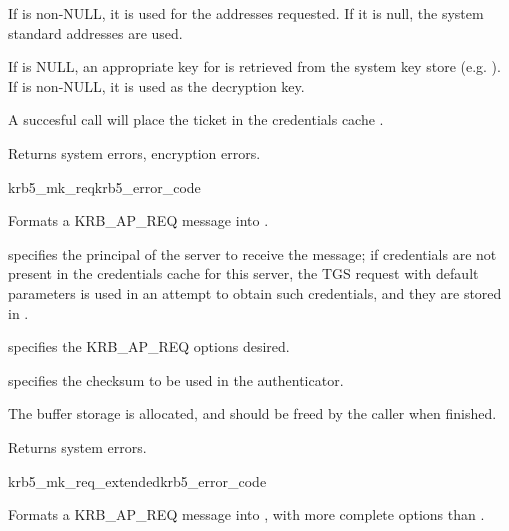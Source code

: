 If  is non-NULL, it is used for the addresses
requested.  If it is null, the system standard addresses are used.

If  is NULL, an appropriate key for
 is retrieved from the system key store (e.g.
).  If  is non-NULL, it is
used as the decryption key.

A succesful call will place the ticket in the credentials cache
.

Returns system errors, encryption errors.

\begin{funcdecl}{krb5_mk_req}{krb5_error_code}{\funcin}
\funcout
{}
\end{funcdecl}

Formats a KRB_AP_REQ message into .

 specifies the principal of the server to receive the
message; if credentials are not present in the credentials cache
 for this server, the TGS request with default
parameters is used in an attempt to obtain such credentials, and they
are stored in .

 specifies the KRB_AP_REQ options desired.

 specifies the checksum to be used in the authenticator.

The  buffer storage is allocated, and should be freed
by the caller when finished.

Returns system errors.


\begin{funcdecl}{krb5_mk_req_extended}{krb5_error_code}{\funcin}
\funcinout
{}
\funcout
{}
\end{funcdecl}

Formats a KRB_AP_REQ message into , with more complete
options than .

